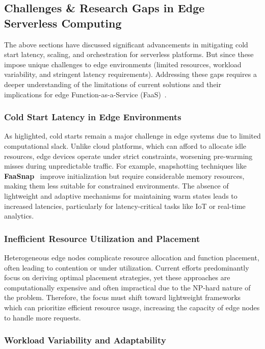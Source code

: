 

\subsection{Challenges \& Research Gaps in Edge Serverless Computing}

The above sections have discussed significant advancements in mitigating cold start latency, scaling, and orchestration for serverless platforms. But since these impose unique challenges to edge environments (limited resources, workload  variability, and stringent latency requirements). Addressing these gaps requires a deeper understanding of the limitations of current solutions and their implications for edge Function-as-a-Service (FaaS)~\cite{rausch_towards_2019}.

\subsubsection{Cold Start Latency in Edge Environments}

As higlighted, cold starts remain a major challenge in edge systems due to limited computational slack. Unlike cloud platforms, which can afford to allocate idle resources, edge devices operate under strict constraints, worsening pre-warming misses during unpredictable traffic. For example, snapshotting techniques like \textbf{FaaSnap}~\cite{ao_faasnap_2022} improve initialization but require considerable memory resources, making them less suitable for constrained environments. The absence of lightweight and adaptive mechanisms for maintaining warm states leads to increased latencies, particularly for latency-critical tasks like IoT or real-time analytics.

\subsubsection{Inefficient Resource Utilization and Placement}

Heterogeneous edge nodes complicate resource allocation and function placement, often leading to contention or under utilization. Current efforts predominantly focus on deriving optimal placement strategies, yet these approaches are computationally expensive and often impractical due to the NP-hard nature of the problem. Therefore, the focus must shift toward lightweight frameworks which can prioritize efficient resource usage, increasing the capacity of edge nodes to handle more requests.

\subsubsection{Workload Variability and Adaptability}

